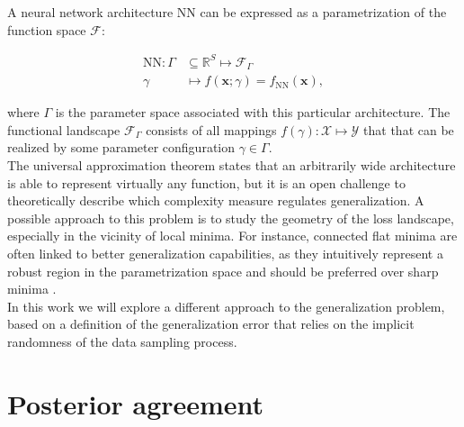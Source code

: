 




A neural network architecture $\text{NN}$ can be expressed as a parametrization of the function space $\mathcal{F}$:

$$
    \begin{aligned}
        \text{NN}: \Gamma & \subseteq \mathbb{R}^{S} \longmapsto \mathcal{F}_{\Gamma} \\
        \gamma & \longmapsto f(\bm{x}; \gamma) = f_{\text{NN}}(\bm{x}),
    \end{aligned}
$$

where $\Gamma$ is the parameter space associated with this particular architecture. The functional
landscape $\mathcal{F}_{\Gamma}$ consists of all mappings $f(\gamma): \mathcal{X} \longmapsto \mathcal{Y}$ that 
that can be realized by some parameter configuration $\gamma \in \Gamma$. \\

The universal approximation theorem states that an arbitrarily wide architecture
is able to represent virtually any function, but it is an open challenge to theoretically describe which
complexity measure regulates generalization. A possible approach to this problem is to
study the geometry of the loss landscape, especially in the vicinity of local minima. For instance, 
connected flat minima are often linked to better generalization capabilities, as they
intuitively represent a robust region in the parametrization space and should be 
preferred over sharp minima
\cite{jimenezInductiveBiasDeep}. \\

In this work we will explore a different approach to the generalization problem, based on
a definition of the generalization error that relies on the implicit randomness of the
data sampling process. 

\section{Posterior agreement}

